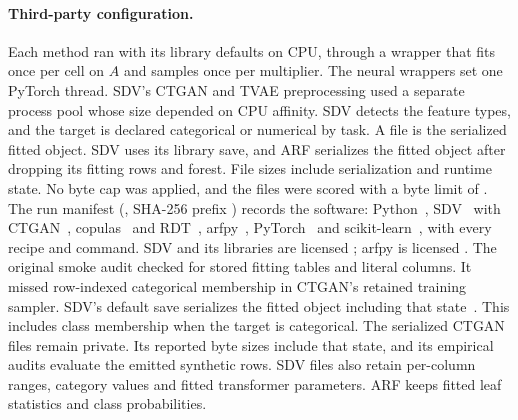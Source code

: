 \paragraph{Third-party configuration.}
Each method ran with its library defaults on CPU, through a wrapper that fits once per cell on $A$ and samples once per multiplier. The neural wrappers set one PyTorch thread. SDV's CTGAN and TVAE preprocessing used a separate process pool whose size depended on CPU affinity.
SDV detects the feature types, and the target is declared categorical or numerical by task.
A file is the serialized fitted object. SDV uses its library save, and ARF serializes the fitted object after dropping its fitting rows and forest. File sizes include serialization and runtime state.
No byte cap was applied, and the files were scored with a byte limit of .
The run manifest (, SHA-256 prefix \texttt{}) records the software: Python~, SDV~ with CTGAN~, copulas~ and RDT~, arfpy~, PyTorch~ and scikit-learn~, with every recipe and command.
SDV and its libraries are licensed ; arfpy is licensed .
The original smoke audit checked for stored fitting tables and literal columns. It missed row-indexed categorical membership in CTGAN's retained training sampler. SDV's default save serializes the fitted object including that state~\citep{ctgan013sampler,sdv22save}. This includes class membership when the target is categorical. The serialized CTGAN files remain private. Its reported byte sizes include that state, and its empirical audits evaluate the emitted synthetic rows.
SDV files also retain per-column ranges, category values and fitted transformer parameters. ARF keeps fitted leaf statistics and class probabilities.
